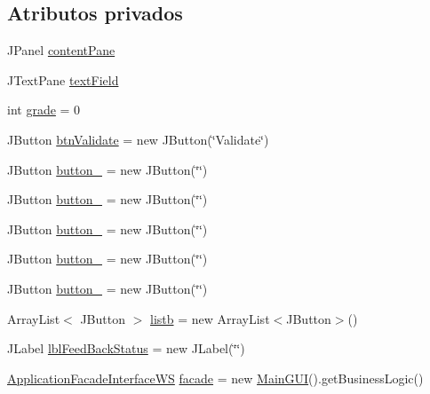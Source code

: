 \subsection*{Atributos privados}
\begin{DoxyCompactItemize}
\item 
J\+Panel \mbox{\hyperlink{classgui_1_1_feed_back_g_u_i_ae4711a299230e0f571f2b3f56f5eb9ee}{content\+Pane}}
\item 
J\+Text\+Pane \mbox{\hyperlink{classgui_1_1_feed_back_g_u_i_ad24dea21bb9450474fd58c7dba162f7e}{text\+Field}}
\item 
int \mbox{\hyperlink{classgui_1_1_feed_back_g_u_i_ab9e6f952b77fa96772b8e417245d94bb}{grade}} = 0
\item 
J\+Button \mbox{\hyperlink{classgui_1_1_feed_back_g_u_i_a401c09b279a8e2369355fd9142284752}{btn\+Validate}} = new J\+Button(\char`\"{}Validate\char`\"{})
\item 
J\+Button \mbox{\hyperlink{classgui_1_1_feed_back_g_u_i_aa98ecf04e9e2c9a78988ad724dcc452f}{button\+\_}} = new J\+Button(\char`\"{}\char`\"{})
\item 
J\+Button \mbox{\hyperlink{classgui_1_1_feed_back_g_u_i_a260750f04cc70576dee71a3d2d321559}{button\+\_}} = new J\+Button(\char`\"{}\char`\"{})
\item 
J\+Button \mbox{\hyperlink{classgui_1_1_feed_back_g_u_i_aecc5a4dbfd0b1914634b7560af5b665e}{button\+\_}} = new J\+Button(\char`\"{}\char`\"{})
\item 
J\+Button \mbox{\hyperlink{classgui_1_1_feed_back_g_u_i_aea4392764854bea3595a730551c76e82}{button\+\_}} = new J\+Button(\char`\"{}\char`\"{})
\item 
J\+Button \mbox{\hyperlink{classgui_1_1_feed_back_g_u_i_a4eff111b91a4af9d69b07d239f8c4175}{button\+\_}} = new J\+Button(\char`\"{}\char`\"{})
\item 
Array\+List$<$ J\+Button $>$ \mbox{\hyperlink{classgui_1_1_feed_back_g_u_i_aebe4840fd7ffe833e3c8976aba4f5dba}{listb}} = new Array\+List$<$J\+Button$>$()
\item 
J\+Label \mbox{\hyperlink{classgui_1_1_feed_back_g_u_i_ae6b839a011e80bf88d8135d3f649f708}{lbl\+Feed\+Back\+Status}} = new J\+Label(\char`\"{}\char`\"{})
\item 
\mbox{\hyperlink{interfacebusiness_logic_1_1_application_facade_interface_w_s}{Application\+Facade\+Interface\+WS}} \mbox{\hyperlink{classgui_1_1_feed_back_g_u_i_a62c1845c6e8a5824711746f6bdf7a202}{facade}} = new \mbox{\hyperlink{classgui_1_1_main_g_u_i}{Main\+G\+UI}}().get\+Business\+Logic()
\end{DoxyCompactItemize}


